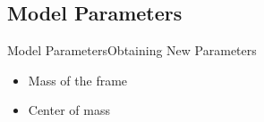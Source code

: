 \subsection{Model Parameters}
\begin{frame}{Model Parameters}{Obtaining New Parameters}
  \begin{itemize}
    \item Mass of the frame
  \end{itemize}
  \begin{itemize}
    \item Center of mass
  \end{itemize}
\end{frame}
